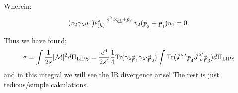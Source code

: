 Wherein:
\begin{equation}
    (v_2\gamma_\lambda u_1)\epsilon^{\lambda}_{(h)} \stackrel{\epsilon^\lambda \propto p_1 + p_2}{=} v_2(\slashed{p}_2 + \slashed{p}_1)u_1 = 0.
\end{equation}

Thus we have found;
\begin{equation}
    \sigma = \int \frac{1}{2s}\abs{\mathcal{M}}^2 d\Pi_{\text{LIPS}} = \frac{e^6}{2s^4}\frac{1}{4}\Tr(\gamma_\lambda \slashed{p}_1 \gamma_{\lambda'}\slashed{p}_2)\int \Tr(J^{\nu\lambda}\slashed{p}_4J^{\lambda'}_{\sp\nu}\slashed{p}_3)d\Pi_{\text{LIPS}}
\end{equation}
and in this integral we will see the IR divergence arise! The rest is just tedious/simple calculations.
